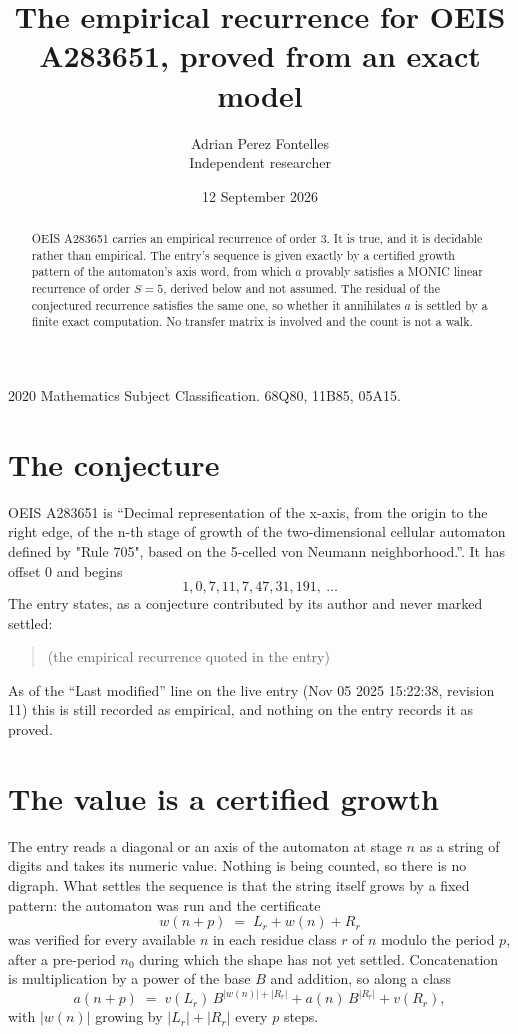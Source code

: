 \documentclass[11pt,a4paper]{article}
\title{The empirical recurrence for OEIS A283651, proved from an exact model}
\author{Adrian Perez Fontelles\\ \small Independent researcher}
\date{12 September 2026}
\theoremstyle{plain}
\theoremstyle{definition}
\begin{document}
\maketitle

\begin{abstract}
OEIS A283651 carries an empirical recurrence of order $3$. It is true, and it is
decidable rather than empirical. The entry's sequence is given exactly by a certified growth pattern of the automaton's axis word, from
which $a$ provably satisfies a MONIC linear recurrence of order $S=5$, derived below and not
assumed. The residual of the conjectured recurrence satisfies the same one, so whether it
annihilates $a$ is settled by a finite exact computation. No transfer matrix is involved and
the count is not a walk.
\end{abstract}

\noindent\small 2020 Mathematics Subject Classification. 68Q80, 11B85, 05A15.\normalsize

\section{The conjecture}

OEIS A283651 is ``Decimal representation of the x-axis, from the origin to the right edge, of the n-th stage of growth of the two-dimensional cellular automaton defined by "Rule 705", based on the 5-celled von Neumann neighborhood.''. It has offset $0$ and begins
\[
1, 0, 7, 11, 7, 47, 31, 191,\ \dots
\]
The entry states, as a conjecture contributed by its author and never marked settled:
\begin{quote}
(the empirical recurrence quoted in the entry)
\end{quote}
As of the ``Last modified'' line on the live entry (Nov 05 2025 15:22:38, revision 11)
this is still recorded as empirical, and nothing on the entry records it as proved.

\section{The value is a certified growth}

The entry reads a diagonal or an axis of the automaton at stage $n$ as a string of digits and takes its
numeric value. Nothing is being counted, so there is no digraph. What settles the sequence is
that the string itself grows by a fixed pattern: the automaton was run and the certificate
\[
w(n+p)\;=\;L_r + w(n) + R_r
\]
was verified for every available $n$ in each residue class $r$ of $n$ modulo the period $p$,
after a pre-period $n_0$ during which the shape has not yet settled. Concatenation is
multiplication by a power of the base $B$ and addition, so along a class
\[
a(n+p)\;=\;v(L_r)\,B^{|w(n)|+|R_r|} + a(n)\,B^{|R_r|} + v(R_r),
\]
with $|w(n)|$ growing by $|L_r|+|R_r|$ every $p$ steps.
\end{document}
